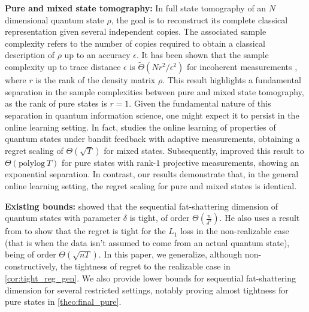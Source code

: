 
\textbf{Pure and mixed state tomography:}
In full state tomography of an $N$ dimensional quantum state $\rho$, the goal is to reconstruct its complete classical representation given several independent copies. The associated sample complexity refers to the number of copies required to obtain a classical description of $\rho$ up to an accuracy  $\epsilon$. It has been shown that the sample complexity up to trace distance $\epsilon$ is $\tilde{\Theta}(N r^2/\epsilon^2)$ for incoherent measurements \citep{harrow16sampletomography, kueng2014lowrankmatrixrecovery, chen2023doesadaptivityhelpquantum}, where $r$ is the rank of the density matrix $\rho$.
This result highlights a fundamental separation in the sample complexities between pure and mixed state tomography, as the rank of pure states is $r=1$.
Given the fundamental nature of this separation in quantum information science, one might expect it to persist in the online learning setting.
In fact, \citep{Lumbreras_2022} studies the online learning of properties of quantum states under bandit feedback with adaptive measurements, obtaining a regret scaling of $\Theta(\sqrt{T})$ for mixed states.
Subsequently, \citep{lumbreras2024learningpurequantumstates} improved this result to $\Theta(\mathrm{polylog}\ T)$ for pure states with rank-$1$ projective measurements, showing an exponential separation.
In contrast, our results demonstrate that, in the general online learning setting, the regret scaling for pure and mixed states is identical.


\textbf{Existing bounds:} \citet{aaronson2019online} showed that the sequential fat-shattering dimension of quantum states with parameter $\delta$ is tight, of order $\Theta(\frac{n}{\delta^2})$. He also uses a result from \citet{arora2012multiplicative} to show that the regret is tight for the $L_1$ loss in the non-realizable case (that is when the data isn't assumed to come from an actual quantum state), being of order $\Theta(\sqrt{nT})$. In this paper, we generalize, although non-constructively, the tightness of regret to the realizable case in \cref{cor:tight_reg_gen}. We also provide lower bounds for sequential fat-shattering dimension for several restricted settings, notably proving almost tightness for pure states in \cref{theo:final_pure}.
